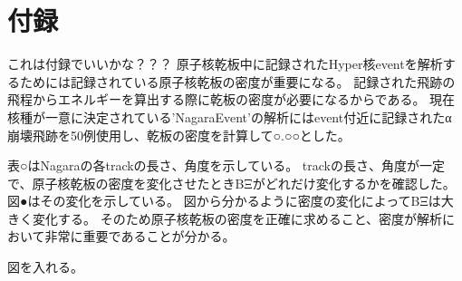 \documentclass[12pt,a4paper]{jarticle}
\begin{document}
\section*{付録}
これは付録でいいかな？？？
原子核乾板中に記録されたHyper核eventを解析するためには記録されている原子核乾板の密度が重要になる。
記録された飛跡の飛程からエネルギーを算出する際に乾板の密度が必要になるからである。
現在核種が一意に決定されている'NagaraEvent'の解析にはevent付近に記録されたα崩壊飛跡を50例使用し、乾板の密度を計算して○.○○とした。
\par
表○はNagaraの各trackの長さ、角度を示している。
trackの長さ、角度が一定で、原子核乾板の密度を変化させたときBΞがどれだけ変化するかを確認した。
図●はその変化を示している。
図から分かるように密度の変化によってBΞは大きく変化する。
そのため原子核乾板の密度を正確に求めること、密度が解析において非常に重要であることが分かる。
\par
図を入れる。
\par
\end{document}
